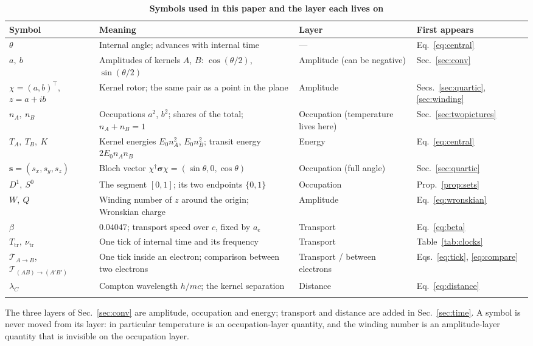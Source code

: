 \documentclass[%
 reprint, amsmath,amssymb, aps, prb, ]{revtex4-2}
\numberwithin{equation}{section}
\newcommand{\Bloch}{\mathbf{s}}
\begin{document}
\begin{table}[t!]
\centering
\caption{\textbf{Symbols used in this paper and the layer each lives on}}
\label{tab:symbols}
\renewcommand{\arraystretch}{1.4}
\begin{tabular}{p{2.6cm}p{5.4cm}p{3.4cm}p{4.0cm}}
\toprule
\textbf{Symbol} & \textbf{Meaning} & \textbf{Layer} & \textbf{First appears} \\
\midrule
$\theta$
& Internal angle; advances with internal time
& ---
& Eq.~\eqref{eq:central} \\
\addlinespace[0.3cm]
$a,\ b$
& Amplitudes of kernels $A$, $B$: $\cos(\theta/2)$, $\sin(\theta/2)$
& Amplitude (can be negative)
& Sec.~\ref{sec:conv} \\
\addlinespace[0.3cm]
$\chi=(a,b)^\top$, $z=a+ib$
& Kernel rotor; the same pair as a point in the plane
& Amplitude
& Secs.~\ref{sec:quartic}, \ref{sec:winding} \\
\addlinespace[0.3cm]
$n_A,\ n_B$
& Occupations $a^2$, $b^2$; shares of the total; $n_A+n_B=1$
& Occupation (temperature lives here)
& Sec.~\ref{sec:twopictures} \\
\addlinespace[0.3cm]
$T_A,\ T_B,\ K$
& Kernel energies $E_0n_A^2$, $E_0n_B^2$; transit energy $2E_0n_An_B$
& Energy
& Eq.~\eqref{eq:central} \\
\addlinespace[0.3cm]
$\Bloch=(s_x,s_y,s_z)$
& Bloch vector $\chi^\dagger\bm{\sigma}\chi=(\sin\theta,0,\cos\theta)$
& Occupation (full angle)
& Sec.~\ref{sec:quartic} \\
\addlinespace[0.3cm]
$D^1,\ S^0$
& The segment $[0,1]$; its two endpoints $\{0,1\}$
& Occupation
& Prop.~\ref{prop:sets} \\
\addlinespace[0.3cm]
$W,\ Q$
& Winding number of $z$ around the origin; Wronskian charge
& Amplitude
& Eq.~\eqref{eq:wronskian} \\
\addlinespace[0.3cm]
$\beta$
& $0.04047$; transport speed over $c$, fixed by $a_e$
& Transport
& Eq.~\eqref{eq:beta} \\
\addlinespace[0.3cm]
$T_{\mathrm{tr}},\ \nu_{\mathrm{tr}}$
& One tick of internal time and its frequency
& Transport
& Table~\ref{tab:clocks} \\
\addlinespace[0.3cm]
$\mathcal{T}_{A\to B}$, $\mathcal{T}_{(AB)\to(A'B')}$
& One tick inside an electron; comparison between two electrons
& Transport / between electrons
& Eqs.~\eqref{eq:tick}, \eqref{eq:compare} \\
\addlinespace[0.3cm]
$\lambda_C$
& Compton wavelength $h/mc$; the kernel separation
& Distance
& Eq.~\eqref{eq:distance} \\
\addlinespace[0.2cm]
\bottomrule
\end{tabular}
\vspace{0.2cm}
\begin{minipage}{0.95\textwidth}
\justifying\footnotesize
The three layers of Sec.~\ref{sec:conv} are amplitude, occupation and energy; transport and distance are added in Sec.~\ref{sec:time}. A symbol is never moved from its layer: in particular temperature is an occupation-layer quantity, and the winding number is an amplitude-layer quantity that is invisible on the occupation layer.
\end{minipage}
\end{table}
\end{document}
